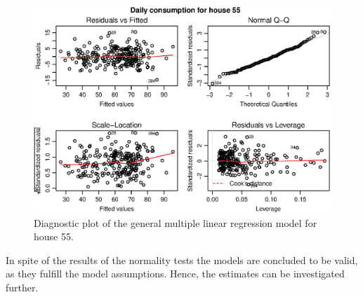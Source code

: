 \begin{figure}
    \centering
    \includegraphics[width=1.\textwidth]{../../../figures/general_lm55L.eps}
    \caption{Diagnostic plot of the general multiple linear regression model for house 55.}
    \label{fig: general_lm55L}
\end{figure}
\noindent In spite of the results of the normality tests the models are concluded to be valid, as they fulfill the model assumptions. Hence, the estimates can be investigated further. 

